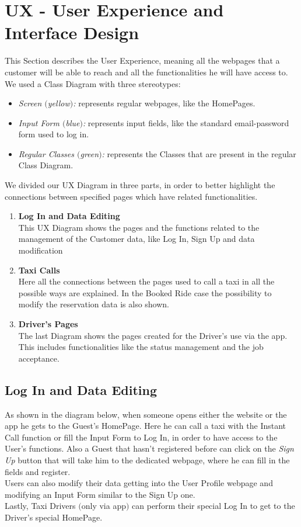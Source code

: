 \section{UX - User Experience and Interface Design}

This Section describes the User Experience, meaning all the webpages that a customer will be able to reach and all the functionalities he will have access to.
\newline
We used a Class Diagram with three stereotypes:
\begin {itemize}
\item \textit{Screen $($yellow$)$:} represents regular webpages, like the HomePages.
\item \textit{Input Form $($blue$)$:} represents input fields, like the standard email-password form used to log in.
\item \textit{Regular Classes $($green$)$:} represents the Classes that are present in the regular Class Diagram.
\end {itemize} 
\hfill
\hfill

We divided our UX Diagram in three parts, in order to better highlight the connections between specified pages which have related functionalities.
\begin{enumerate}
\item \textbf{Log In and Data Editing}\\
	This UX Diagram shows the pages and the functions related to the management of the Customer data, like Log In, Sign Up and data modification
\item \textbf{Taxi Calls}\\
	Here all the connections between the pages used to call a taxi in all the possible ways are explained. 
	In the Booked Ride case the possibility to modify the reservation data is also shown.
\item \textbf{Driver's Pages}\\ 
	The last Diagram shows the pages created for the Driver's use via the app. 
	This includes functionalities like the status management and the job acceptance.
	
\end{enumerate}
\newpage

\subsection{Log In and Data Editing}
As shown in the diagram below, when someone opens either the website or the app he gets to the Guest's HomePage. Here he can call a taxi with the Instant Call function or fill the Input Form to Log In, in order to have access to the User's functions. Also a Guest that hasn't registered before can click on the \textit{Sign Up} button that will take him to the dedicated webpage, where he can fill in the fields and register.\\
Users can also modify their data getting into the User Profile webpage and modifying an Input Form similar to the Sign Up one. \\
Lastly, Taxi Drivers $($only via app$)$ can perform their special Log In to get to the Driver's special HomePage. 

